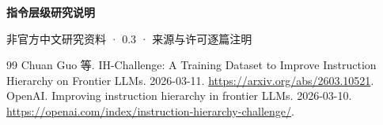 \mainmatter
\begin{center}{\color{structurecolor}\bfseries\fontsize{18}{24}\selectfont 指令层级研究说明}\par
非官方中文研究资料 · 0.3 · 来源与许可逐篇注明\end{center}
\originalcontents
\clearpage

\begin{thebibliography}{99}
 Chuan Guo 等. IH-Challenge: A Training Dataset to Improve Instruction Hierarchy on Frontier LLMs. 2026-03-11. \url{https://arxiv.org/abs/2603.10521}.
 OpenAI. Improving instruction hierarchy in frontier LLMs. 2026-03-10. \url{https://openai.com/index/instruction-hierarchy-challenge/}.
\end{thebibliography}

